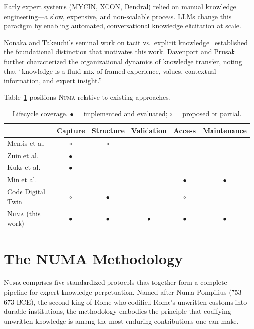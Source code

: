\documentclass[11pt,a4paper]{article}
\begin{document}
Early expert systems (MYCIN, XCON, Dendral) relied on manual knowledge engineering---a slow, expensive, and non-scalable process. LLMs change this paradigm by enabling automated, conversational knowledge elicitation at scale.

Nonaka and Takeuchi's seminal work on tacit vs.\ explicit knowledge~\cite{nonaka1995} established the foundational distinction that motivates this work. Davenport and Prusak~\cite{davenport1998} further characterized the organizational dynamics of knowledge transfer, noting that ``knowledge is a fluid mix of framed experience, values, contextual information, and expert insight.''

Table~\ref{tab:lifecycle} positions \textsc{Numa} relative to existing approaches.

\begin{table}[ht]
\centering
\caption{Lifecycle coverage. $\bullet$ = implemented and evaluated; $\circ$ = proposed or partial.}
\label{tab:lifecycle}
\begin{tabular}{lccccc}
\hline
 & Capture & Structure & Validation & Access & Maintenance \\
\hline
Mentis et al.~\cite{mentis2025} & $\circ$ & $\circ$ & & & \\
Zuin et al.~\cite{zuin2025} & $\bullet$ & & & & \\
Kuks et al.~\cite{kuks2025} & $\bullet$ & & & & \\
Min et al.~\cite{min2025} & & & & $\bullet$ & $\bullet$ \\
Code Digital Twin~\cite{cdt2025} & $\circ$ & $\bullet$ & & $\circ$ & \\
\hline
\textsc{Numa} (this work) & $\bullet$ & $\bullet$ & $\bullet$ & $\bullet$ & $\bullet$ \\
\hline
\end{tabular}
\end{table}

\section{The NUMA Methodology}

\textsc{Numa} comprises five standardized protocols that together form a complete pipeline for expert knowledge perpetuation. Named after Numa Pompilius (753--673 BCE), the second king of Rome who codified Rome's unwritten customs into durable institutions, the methodology embodies the principle that codifying unwritten knowledge is among the most enduring contributions one can make.
\end{document}
